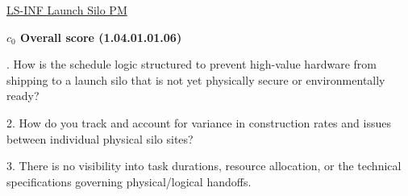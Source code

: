% 


\begin{frame}{\href{run:../local/source-docs/1.04.01.01.06.pdf}{LS-INF Launch Silo PM}}
\centering
{}
\par
\vspace{0.75em}
\textbf{\small{\(c_0\) Overall score {\tiny (1.04.01.01.06)}}}\\\par
\vspace{0.5em}
\begin{minipage}{0.85\textwidth}
\raggedright
\fontsize{7}{9}. How is the schedule logic structured to prevent high-value hardware from shipping to a launch silo that is not yet physically secure or environmentally ready?\par\vspace{0.5em}2. How do you track and account for variance in construction rates and issues between individual physical silo sites?\par\vspace{0.5em}3. There is no visibility into task durations, resource allocation, or the technical specifications governing physical/logical handoffs.\par
\end{minipage}
\end{frame}
%
